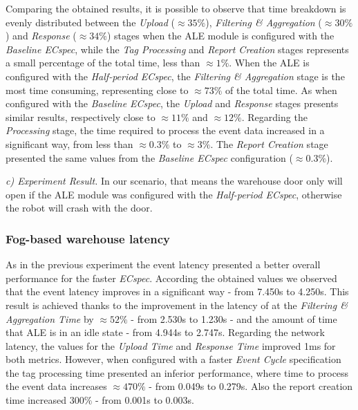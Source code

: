 Comparing the obtained results, it is possible to observe that time breakdown is evenly distributed
between the \textit{Upload} ($\approx35\%$), \textit{Filtering \& Aggregation} ($\approx30\%$) and
\textit{Response} ($\approx34\%$) stages when the \gls{ALE} module is configured with the \textit{Baseline ECspec},
while the \textit{Tag Processing} and \textit{Report Creation} stages represents a small percentage of the
total time, less than $\approx1\%$. When the \gls{ALE} is configured with the \textit{Half-period ECspec},
the \textit{Filtering \& Aggregation} stage is the most time consuming, representing close to $\approx 73\%$
of the total time. As when configured with the \textit{Baseline ECspec}, the \textit{Upload} and
\textit{Response} stages presents similar results, respectively close to $\approx11\%$ and $\approx12\%$.
Regarding the \textit{Processing} stage, the time required to process the event data increased in a significant
way, from less than $\approx0.3\%$ to $\approx3\%$. The \textit{Report Creation} stage presented the same
values from the \textit{Baseline ECspec} configuration ($\approx0.3\%$).

\textit{c) Experiment Result.}
In our scenario, that means the warehouse door only will open if the \gls{ALE} module was configured
with the \textit{Half-period ECspec}, otherwise the robot will crash with the door.

\subsubsection{Fog-based warehouse latency}
\label{subs:eval_exp_latency_ecspec}
As in the previous experiment the event latency presented a better overall performance for the
faster \textit{ECspec}. According the obtained values we observed that the event latency improves
in a significant way - from 7.450s to 4.250s. This result is achieved thanks to the improvement in
the latency of at the \textit{Filtering \& Aggregation Time} by $\approx52\%$ - from 2.530s to 1.230s -
and the amount of time that \gls{ALE} is in an idle state - from 4.944s to 2.747s. Regarding the
network latency, the values for the \textit{Upload Time} and \textit{Response Time} improved 1ms
for both metrics. However, when configured with a faster \textit{Event Cycle} specification the
tag processing time presented an inferior performance, where time to process the event data increases
$\approx470\%$ - from 0.049s to 0.279s. Also the report creation time increased $300\%$ - from 0.001s to 0.003s.

